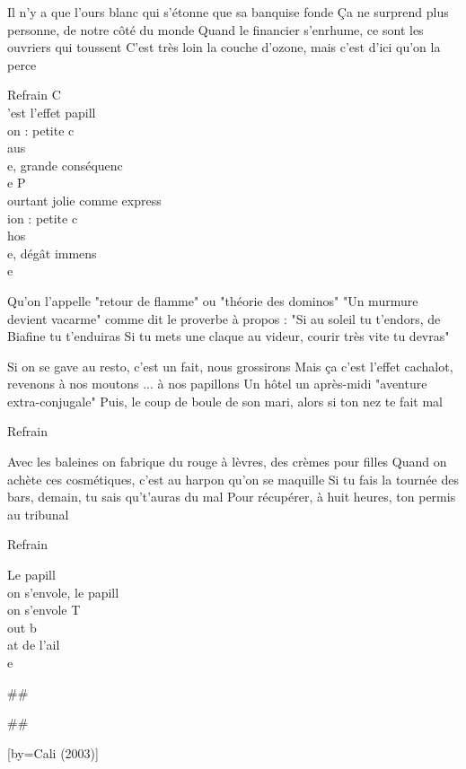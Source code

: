 \beginverse
Il n'y a que l'ours blanc qui s'étonne que sa banquise fonde
Ça ne surprend plus personne, de notre côté du monde
Quand le financier s'enrhume, ce sont les ouvriers qui toussent
C'est très loin la couche d'ozone, mais c'est d'ici qu'on la perce
\endverse

\beginverse
Refrain
C\\[Do]'est l'effet papill\\[Lam]on : petite c\\[Fa]aus\\[Sol]e, grande conséquenc\\[Do]e
P\\[Do]ourtant jolie comme express\\[Lam]ion : petite c\\[Fa]hos\\[Sol]e, dégât immens\\[Do]e
\endverse

\beginverse
Qu'on l'appelle "retour de flamme" ou "théorie des dominos"
"Un murmure devient vacarme" comme dit le proverbe à propos :
"Si au soleil tu t'endors, de Biafine tu t'enduiras
Si tu mets une claque au videur, courir très vite tu devras"
\endverse

\beginverse
Si on se gave au resto, c'est un fait, nous grossirons
Mais ça c'est l'effet cachalot, revenons à nos moutons
... à nos papillons
Un hôtel un après-midi "aventure extra-conjugale"
Puis, le coup de boule de son mari, alors si ton nez te fait mal
\endverse

\beginverse
Refrain
\endverse

\beginverse
Avec les baleines on fabrique du rouge à lèvres, des crèmes pour filles
Quand on achète ces cosmétiques, c'est au harpon qu'on se maquille
Si tu fais la tournée des bars, demain, tu sais qu't'auras du mal
Pour récupérer, à huit heures, ton permis au tribunal
\endverse

\beginverse
Refrain
\endverse

\beginverse
Le papill\\[Do]on s'envole, le papill\\[Lam]on s'envole
T\\[Fa]out b\\[Sol]at de l'ail\\[Do]e
\\[bis]
\endverse

## 

## 

[by={Cali (2003)}]

